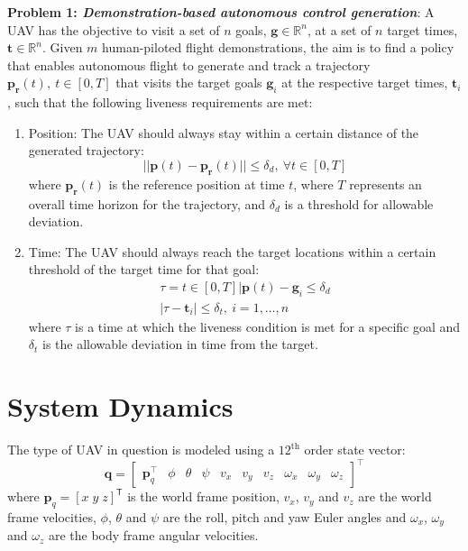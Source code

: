 \documentclass[letterpaper, 10 pt, conference]{ieeeconf}  %
\newcommand\NB[1]{$\spadesuit$\footnote{NB: #1}}
\begin{document}
\textbf{Problem 1: \textit{Demonstration-based autonomous control generation}}: A UAV has the objective to visit a set of $n$ goals, $\mathbf{g}\in\mathbb{R}^{n}$, at a set of $n$ target times, $\mathbf{t} \in\mathbb{R}^{n}$. Given $m$ human-piloted flight demonstrations, the aim is to find a policy that enables autonomous flight to generate and track a trajectory $\mathbf{p_r}(t),~ t \in [0,T]$ that visits the target goals $\mathbf{g}_i$ at the respective target times, $\mathbf{t}_i$, such that the following liveness requirements are met:
\begin{enumerate}
    \item  Position: The UAV should always stay within a certain distance of the generated trajectory:
    \begin{equation} \label{eq:positlive}
        ||\mathbf{p}(t)-\mathbf{p_r}(t)|| \leq \delta_d,~\forall t \in [0,T]
    \end{equation}
    where $\mathbf{p_r}(t)$ is the reference position at time $t$, where $T$ represents an overall time horizon for the trajectory, and $\delta_d$ is a threshold for allowable deviation.
    \item  Time: The UAV should always reach the target locations within a certain threshold of the target time for that goal:
    \begin{align}
        \tau = t\in[0,T]|\mathbf{p}(t)-\mathbf{g}_i \leq \delta_d \nonumber \\
        |\tau- \mathbf{t}_i| \leq \delta_t,~i=1,\ldots,n \label{eq:time_live}
    \end{align}
    where $\tau$ is a time at which the liveness condition is met for a specific goal and $\delta_t$ is the allowable deviation in time from the target.
\end{enumerate}


\section{System Dynamics}
The type of UAV in question is modeled using a $12^{\text{th}}$ order state vector:
\begin{equation}
    \mathbf{q} = 
    \begin{bmatrix}
    \mathbf{p}_q^\intercal & \phi & \theta & \psi & v_x & v_y & v_z & \omega_x & \omega_y & \omega_z
    \end{bmatrix}^\intercal \nonumber
\end{equation} %
where $\bm{p}_q=[x \; y \; z]^{\mathsf{T}}$ is the world frame position, $v_{x}$, $v_{y}$ and $v_z$ are the world frame velocities, $\phi$, $\theta$ and $\psi$ are the roll, pitch and yaw Euler angles and $\omega_{x}$, $\omega_{y}$ and $\omega_{z}$ are the body frame angular velocities.
\end{document}
